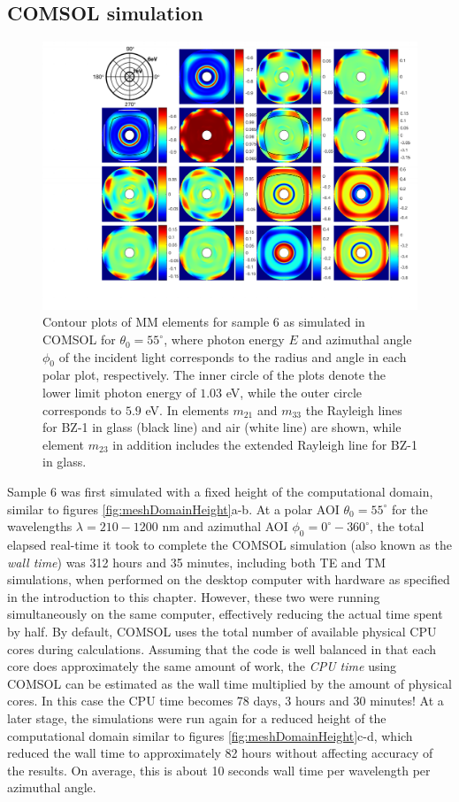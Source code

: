 \subsection{COMSOL simulation}  %
\begin{figure}  %
    \centering
    \includegraphics[width=\linewidth, trim=3cm 1.5cm 0.5cm 0cm, clip]{figures/ch4/S6/contour/Mueller_rot_S6_COMSOLSIM_55(2)(4).pdf}
    \caption{Contour plots of MM elements for sample 6 as simulated in COMSOL for $\theta_0=55^\circ$, where photon energy $E$ and azimuthal angle $\phi_0$ of the incident light corresponds to the radius and angle in each polar plot, respectively. The inner circle of the plots denote the lower limit photon energy of $1.03$ eV, while the outer circle corresponds to $5.9$ eV. In elements $m_{21}$ and $m_{33}$ the Rayleigh lines for BZ-1 in glass (black line) and air (white line) are shown, while element $m_{23}$ in addition includes the extended Rayleigh line for BZ-1 in glass. }
    \label{fig:S6_contour_MM} 
\end{figure}
Sample 6 was first simulated with a fixed height of the computational domain, similar to figures \ref{fig:meshDomainHeight}a-b. At a polar AOI $\theta_0=55^\circ$ for the wavelengths $\lambda=210-1200$ nm and azimuthal AOI $\phi_0=0^\circ-360^\circ$, the total elapsed real-time it took to complete the COMSOL simulation (also known as the \emph{wall time}) was 312 hours and 35 minutes, including both TE and TM simulations, when performed on the desktop computer with hardware as specified in the introduction to this chapter. However, these two were running simultaneously on the same computer, effectively reducing the actual time spent by half. By default, COMSOL uses the total number of available physical CPU cores during calculations. Assuming that the code is well balanced in that each core does approximately the same amount of work, the \emph{CPU time} using COMSOL can be estimated as the wall time multiplied by the amount of physical cores. In this case the CPU time becomes 78 days, 3 hours and 30 minutes! At a later stage, the simulations were run again for a reduced height of the computational domain similar to figures \ref{fig:meshDomainHeight}c-d, which reduced the wall time to approximately 82 hours without affecting accuracy of the results. On average, this is about 10 seconds wall time per wavelength per azimuthal angle.


